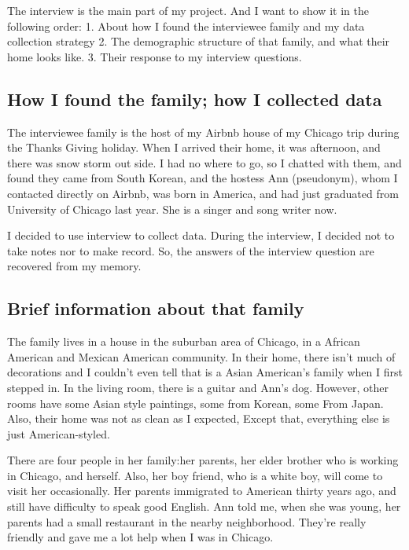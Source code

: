 The interview is the main part of my project. And I want to show it in the
following order: 1. About how I found the interviewee family and my data
collection strategy 2. The demographic structure of that family, and what their
home looks like. 3. Their response to my interview questions.
\subsection{How I found the family; how I collected data}
The interviewee family is the host of my Airbnb house of my Chicago trip during
the Thanks Giving holiday. When I arrived their home, it was afternoon, and
there was snow storm out side. I had no where to go, so I chatted with them, and
found they came from South Korean, and the hostess Ann (pseudonym), whom I contacted 
directly on Airbnb, was born in America, and had just graduated from 
University of Chicago last year. She is a singer and song writer now.
\par
I decided to use interview to collect data. During the interview, I decided not
to take notes nor to make record. So, the answers of the interview question are
recovered from my memory. 
\subsection{Brief information about that family}
The family lives in a house in the suburban area of Chicago, in a African
American and Mexican American community. In their home, there isn't much of
decorations and I couldn't even tell that is a Asian American's family when I
first stepped in. In the living room, there is a guitar and Ann's
dog. However, other rooms have some Asian style paintings, some from
Korean, some From Japan. Also, their home was not as clean as I expected, Except
that, everything else is just American-styled.
\par
There are four people in her family:her parents, her elder brother who is
working in Chicago, and herself. Also, her boy friend, who is a white boy, will
come to visit her occasionally. Her parents immigrated to American thirty years
ago, and still have difficulty to speak good English. Ann told
me, when she was young, her parents had a small restaurant in the nearby
neighborhood. They're really friendly and gave me a lot help when I was in
Chicago.
